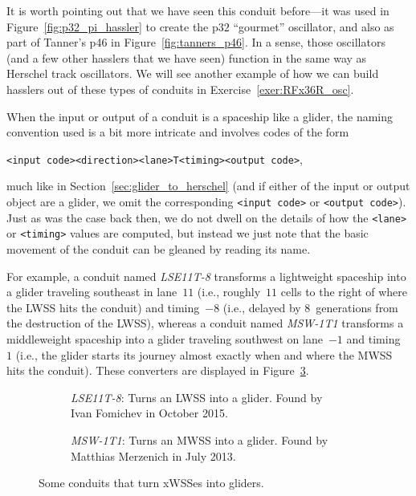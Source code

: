 It is worth pointing out that we have seen this conduit before---it was used in Figure~\ref{fig:p32_pi_hassler} to create the p$32$ ``gourmet'' oscillator, and also as part of Tanner's p46 in Figure~\ref{fig:tanners_p46}. In a sense, those oscillators (and a few other hasslers that we have seen) function in the same way as Herschel track oscillators. We will see another example of how we can build hasslers out of these types of conduits in Exercise~\ref{exer:RFx36R_osc}.

When the input or output of a conduit is a spaceship like a glider, the naming convention used is a bit more intricate and involves codes of the form
\begin{center}
	\verb|<input code><direction><lane>T<timing><output code>|,
\end{center}
much like in Section~\ref{sec:glider_to_herschel} (and if either of the input or output object are a glider, we omit the corresponding \verb|<input code>| or \verb|<output code>|). Just as was the case back then, we do not dwell on the details of how the \verb|<lane>| or \verb|<timing>| values are computed, but instead we just note that the basic movement of the conduit can be gleaned by reading its name.

For example, a conduit named \emph{LSE11T-8} transforms a lightweight spaceship into a glider traveling southeast in lane~$11$ (i.e., roughly~$11$ cells to the right of where the LWSS hits the conduit) and timing~$-8$ (i.e., delayed by $8$~generations from the destruction of the LWSS), whereas a conduit named \emph{MSW-1T1} transforms a middleweight spaceship into a glider traveling southwest on lane~$-1$ and timing~$1$ (i.e., the glider starts its journey almost exactly when and where the MWSS hits the conduit). These converters are displayed in Figure~\ref{fig:XWSS_to_G}.

\begin{figure}[!htb]
	\centering
	\begin{subfigure}{.46\textwidth}
		\centering{}
		\caption{\emph{LSE11T-8}: Turns an LWSS into a glider. Found by Ivan Fomichev in October 2015.}\label{fig:L_to_G}
	\end{subfigure} \hfill
	\begin{subfigure}{.51\textwidth}
		\centering{}
		\caption{\emph{MSW-1T1}: Turns an MWSS into a glider. Found by Matthias Merzenich in July 2013.}\label{fig:M_to_G}
	\end{subfigure}
	\caption{Some conduits that turn xWSSes into gliders.}
	\label{fig:XWSS_to_G}
\end{figure}

